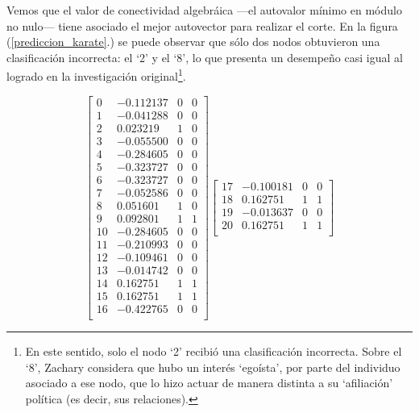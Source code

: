 \vspace{1em}
Vemos que el valor de conectividad algebráica ---el autovalor mínimo en módulo no nulo--- tiene asociado el mejor autovector para realizar el corte. En la figura (\ref{prediccion_karate}.) se puede observar que sólo dos nodos obtuvieron una clasificación incorrecta: el `2' y el `8', lo que presenta un desempeño casi igual al logrado en la investigación original\footnote{En este sentido, solo el nodo `2' recibió una clasificación incorrecta. Sobre el `8', Zachary considera \cite{Zachary} que hubo un interés `egoísta', por parte del individuo asociado a ese nodo, que lo hizo actuar de manera distinta a su `afiliación' política (es decir, sus relaciones).}.

\newpage
\vspace{2em}
\begin{figure}[!htbp]
\begin{equation*}
    \begin{bmatrix}
        0   &-0.112137 & 0 & 0 \\ 
        1   &-0.041288 & 0 & 0 \\
        2   &0.023219 & 1 & 0 \\
        3   &-0.055500 & 0 & 0 \\
        4   &-0.284605 & 0 & 0 \\
        5   &-0.323727 & 0 & 0 \\
        6   &-0.323727 & 0 & 0 \\
        7   &-0.052586 & 0 & 0 \\
        8   &0.051601 & 1 & 0 \\
        9   &0.092801 & 1 & 1 \\
        10  &-0.284605 & 0 & 0 \\
        11  &-0.210993 & 0 & 0 \\
        12  &-0.109461 & 0 & 0 \\
        13  &-0.014742 & 0 & 0 \\
        14  &0.162751 & 1 & 1 \\
        15  &0.162751 & 1 & 1 \\
        16  &-0.422765 & 0 & 0 \\
    \end{bmatrix}
    \begin{bmatrix}
        17  &-0.100181 & 0 & 0 \\
        18  &0.162751 & 1 & 1 \\
        19  &-0.013637 & 0 & 0 \\
        20  &0.162751 & 1 & 1 \\

\end{bmatrix}
\end{equation*}
\end{figure}
